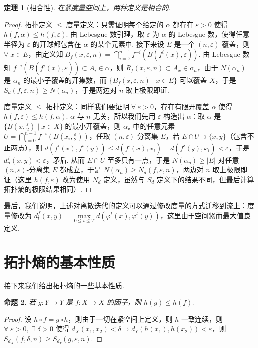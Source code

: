 \documentclass[11pt, a4paper, oneside]{ctexart}
\newtheorem{theorem}{定理}[section]
\newtheorem{proposition}[theorem]{命题}
\newcommand{\abs}[1]{\left|{#1}\right|}
\begin{document}
    \begin{theorem}[相合性]
        在紧度量空间上，两种定义是相合的.
    \end{theorem}
    \begin{proof}
        拓扑定义 $\leq$ 度量定义：只需证明每个给定的 $\alpha$ 都存在 $\varepsilon>0$ 使得 $h(f,\alpha)\leq h(f,\varepsilon)$. 由 Lebesgue 数引理，取 $\varepsilon$ 为 $\alpha$ 的 Lebesgue 数，使得任意半径为 $\varepsilon$ 的开球都包含在 $\alpha$ 的某个元素中. 接下来设 $E$ 是一个 $(n,\varepsilon)$-覆盖，则 $\forall\; x\in E$，由定义知 $B_f(x,\varepsilon,n)=\bigcap\limits_{i=0}^{n-1}f^{-i}(B(f^i(x),\varepsilon))$. 由 Lebesgue 数知 $f^{-i}(B(f^i(x),\varepsilon))\subset A_i\in\alpha$，则 $B_f(x,\varepsilon,n)\subset A_x\in\alpha_n$，由于 $N(\alpha_n)$ 是 $\alpha_n$ 的最小子覆盖的开集数，而 $\{B_f(x,\varepsilon,n)\mid x\in E\}$ 可以覆盖 $X$，于是 $S_d(f,\varepsilon,n)\geq N(\alpha_n)$，于是两边对 $n$ 取上极限即证.
        
        度量定义 $\leq$ 拓扑定义：同样我们要证明 $\forall\; \varepsilon>0$，存在有限开覆盖 $\alpha$ 使得 $h(f,\varepsilon)\leq h(f,\alpha)$. $\alpha$ 与 $n$ 无关，所以我们先用 $\varepsilon$ 构造出 $\alpha$：取 $\alpha$ 是 $\{B(x,\frac{\varepsilon}{2})\mid x\in X\}$ 的最小开覆盖，则 $\alpha_n$ 中的任意元素 $U=\bigcap\limits_{i=0}^{n-1}f^{-i}(B(x_i,\frac{\varepsilon}{2}))$，任取 $(n,\varepsilon)$-分离集 $E$，若 $E\cap U\supset \{x,y\}$（包含不止两点），则 $d(f^i(x),f^i(y))\leq d(f^i(x),x_i)+d(f^i(y),x_i)<\varepsilon$，于是 $d_n^f(x,y)<\varepsilon$，矛盾. 从而 $E\cap U$ 至多只有一点，于是 $N(\alpha_n)\geq \abs{E}$ 对任意 $(n,\varepsilon)$-分离集 $E$ 都成立，于是 $N(\alpha_n)\geq N_d(f,\varepsilon,n)$，两边对 $n$ 取上极限即证（这里 $h(f,\varepsilon)$ 改为使用 $N_d$ 定义，虽然与 $S_d$ 定义下的结果不同，但最后计算拓扑熵的极限结果相同）.
    \end{proof}

    最后，我们说明，上述对离散迭代的定义可以通过修改度量的方式迁移到流上：度量修改为 $d_t^f(x,y)=\max\limits_{0\leq t\leq T}d(\varphi^t(x),\varphi^t(y))$，这里由于空间紧而最大值良定义.

    \section{拓扑熵的基本性质}
    接下来我们给出拓扑熵的一些基本性质.
    
    \begin{proposition}
        若 $g:Y\to Y$ 是 $f:X\to X$ 的因子，则 $h(g)\leq h(f)$.
    \end{proposition}
    \begin{proof}
        设 $h\circ f=g\circ h$，则由于一切在紧空间上定义，则 $h$ 一致连续，则 $\forall\; \varepsilon>0,\; \exists\; \delta>0$ 使得 $d_X(x_1,x_2)<\delta\Rightarrow d_Y(h(x_1),h(x_2))<\varepsilon$，则 $S_{d_X}(f,\delta,n)\geq S_{d_Y}(g,\varepsilon,n)$.
    \end{proof}
\end{document}
